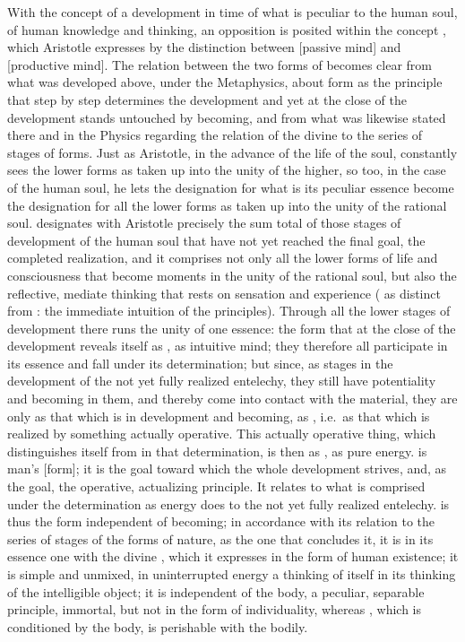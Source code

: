 With the concept of a development in time of what is peculiar to the human soul, of human knowledge and thinking, an opposition is posited within the concept , which Aristotle expresses by the distinction between  [passive mind] and  [productive mind]. The relation between the two forms of  becomes clear from what was developed above, under the Metaphysics, about form as the principle that step by step determines the development and yet at the close of the development stands untouched by becoming, and from what was likewise stated there and in the Physics regarding the relation of the divine  to the series of stages of forms. Just as Aristotle, in the advance of the life of the soul, constantly sees the lower forms as taken up into the unity of the higher, so too, in the case of the human soul, he lets the designation for what is its peculiar essence become the designation for all the lower forms as taken up into the unity of the rational soul.  designates with Aristotle precisely the sum total of those stages of development of the human soul that have not yet reached the final goal, the completed realization, and it comprises not only all the lower forms of life and consciousness that become moments in the unity of the rational soul, but also the reflective, mediate thinking that rests on sensation and experience ( as distinct from : the immediate intuition of the principles). Through all the lower stages of development there runs the unity of one essence: the form that at the close of the development reveals itself as , as intuitive mind; they therefore all participate in its essence and fall under its determination; but since, as stages in the development of the not yet fully realized entelechy, they still have potentiality and becoming in them, and thereby come into contact with the material, they are  only as that which is in development and becoming, as , i.e.\ as that which is realized by something actually operative. This actually operative thing, which distinguishes itself from  in that determination, is then  as , as pure energy.  is man's  [form]; it is the goal toward which the whole development strives, and, as the goal, the operative, actualizing principle. It relates to what is comprised under the determination  as energy does to the not yet fully realized entelechy.  is thus the form independent of becoming; in accordance with its relation to the series of stages of the forms of nature, as the one that concludes it, it is in its essence one with the divine , which it expresses in the form of human existence; it is simple and unmixed, in uninterrupted energy a thinking of itself in its thinking of the intelligible object; it is independent of the body, a peculiar, separable principle, immortal, but not in the form of individuality, whereas 
, which is conditioned by the body, is perishable with the bodily.

